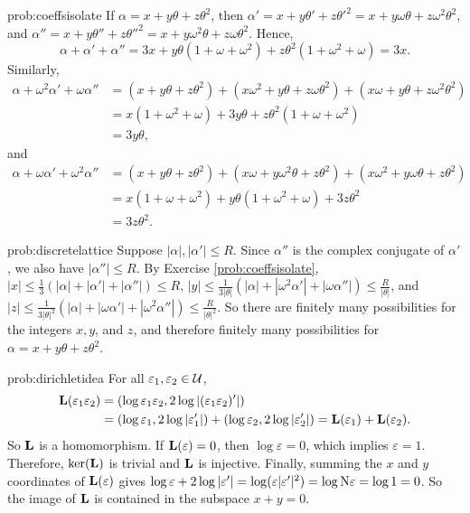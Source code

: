 \begin{sol}{prob:coeffsisolate} If $\alpha = x+y\theta + z\theta^2$, then $\alpha' = x + y\theta' + z\theta'^2 = x+y\omega\theta + z\omega^2 \theta^2$, and $\alpha'' = x + y\theta'' + z\theta''^2 = x+y\omega^2\theta + z\omega \theta^2$. Hence,
\[ \alpha+\alpha' + \alpha'' = 3x + y\theta(1+\omega+\omega^2) + z\theta^2(1+\omega^2+\omega)= 3x.\]
Similarly,
\begin{align*} \alpha + \omega^2 \alpha' + \omega \alpha'' &= (x+y\theta + z\theta^2) + (x \omega^2 + y\theta + z\omega \theta^2) + (x\omega + y\theta + z\omega^2 \theta^2) \\
&= x(1+\omega^2+\omega) + 3y\theta + z\theta^2 (1+\omega + \omega^2) \\&=3y\theta,
\end{align*}
and
\begin{align*}
\alpha + \omega\alpha' + \omega^2\alpha'' &= (x+y\theta+z\theta^2) + (x\omega + y\omega^2\theta + z\theta^2) + (x\omega^2 + y\omega \theta + z\theta^2) \\
&= x(1+\omega+\omega^2) + y\theta(1+\omega^2+\omega) + 3z\theta^2 \\
&= 3z\theta^2.
\end{align*}
\end{sol}

\begin{sol}{prob:discretelattice} Suppose $|\alpha|, |\alpha'|\le R$. Since $\alpha''$ is the complex conjugate of $\alpha'$, we also have $|\alpha''|  \le R$. By Exercise \ref{prob:coeffsisolate}, $|x| \le \frac{1}{3} (|\alpha|+|\alpha'|+|\alpha''|) \le R$, $|y| \le \frac{1}{3|\theta|}(|\alpha| +|\omega^2\alpha'| + |\omega\alpha''|) \le \frac{R}{|\theta|}$, and $|z| \le \frac{1}{3|\theta|^2}(|\alpha| + |\omega\alpha'| + |\omega^2\alpha''|) \le \frac{R}{|\theta|^2}$. So there are finitely many possibilities for the integers $x, y$, and $z$, and therefore  finitely many possibilities for $\alpha = x + y\theta + z\theta^2$.
\end{sol}

\begin{sol}{prob:dirichletidea} For all $\varepsilon_1,\varepsilon_2 \in \mathcal{U}$, 
\begin{align*} \mathbf{L}(\varepsilon_1 \varepsilon_2) &= (\log \varepsilon_1\varepsilon_2, 2\log|(\varepsilon_1 \varepsilon_2)'|) \\&= (\log \varepsilon_1,2\log|\varepsilon_1'|) + (\log \varepsilon_2,2\log|\varepsilon_2'|) = \mathbf{L}(\varepsilon_1) + \mathbf{L}(\varepsilon_2).\end{align*} So $\mathbf{L}$ is a homomorphism. If $\mathbf{L}(\varepsilon) = 0$, then $\log{\varepsilon}=0$, which implies $\varepsilon=1$. Therefore, $\ker(\mathbf{L})$ is trivial and $\mathbf{L}$ is injective. Finally, summing the $x$ and $y$ coordinates of $\mathbf{L}(\varepsilon)$ gives $\log \varepsilon + 2 \log|\varepsilon'| = \log(\varepsilon|\varepsilon'|^2) = \log \mathrm{N}{\varepsilon}= \log 1 = 0$. So the image of $\mathbf{L}$ is contained in the subspace $x+y=0$.
\end{sol}


